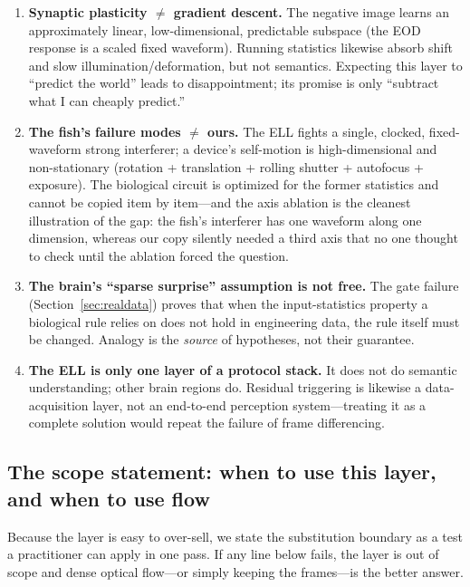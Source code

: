 \documentclass[12pt,a4paper]{article}
\begin{document}
\begin{enumerate}
  \item \textbf{Synaptic plasticity $\ne$ gradient descent.} The negative image learns an approximately linear, low-dimensional, predictable subspace (the EOD response is a scaled fixed waveform). Running statistics likewise absorb shift and slow illumination/deformation, but not semantics. Expecting this layer to ``predict the world'' leads to disappointment; its promise is only ``subtract what I can cheaply predict.''
  \item \textbf{The fish's failure modes $\ne$ ours.} The ELL fights a single, clocked, fixed-waveform strong interferer; a device's self-motion is high-dimensional and non-stationary (rotation + translation + rolling shutter + autofocus + exposure). The biological circuit is optimized for the former statistics and cannot be copied item by item---and the axis ablation is the cleanest illustration of the gap: the fish's interferer has one waveform along one dimension, whereas our copy silently needed a third axis that no one thought to check until the ablation forced the question.
  \item \textbf{The brain's ``sparse surprise'' assumption is not free.} The gate failure (Section~\ref{sec:realdata}) proves that when the input-statistics property a biological rule relies on does not hold in engineering data, the rule itself must be changed. Analogy is the \emph{source} of hypotheses, not their guarantee.
  \item \textbf{The ELL is only one layer of a protocol stack.} It does not do semantic understanding; other brain regions do. Residual triggering is likewise a data-acquisition layer, not an end-to-end perception system---treating it as a complete solution would repeat the failure of frame differencing.
\end{enumerate}

\subsection{The scope statement: when to use this layer, and when to use flow}
\label{sec:scope}

Because the layer is easy to over-sell, we state the substitution boundary as a test a practitioner can apply in one pass. If any line below fails, the layer is out of scope and dense optical flow---or simply keeping the frames---is the better answer.
\end{document}
